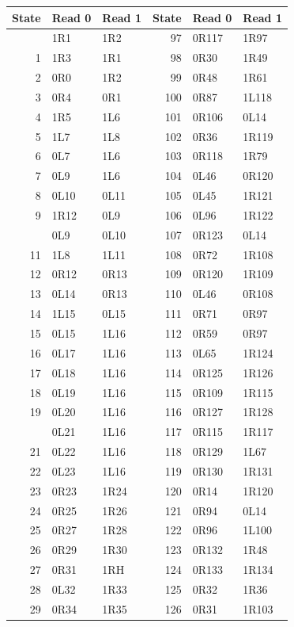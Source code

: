 \begingroup\small\setlength{\tabcolsep}{12pt}
\begin{longtable}{@{}rll@{\qquad}rll@{}}
\toprule
State & Read 0 & Read 1 & State & Read 0 & Read 1\\
\midrule\endhead
\bottomrule\endfoot
0 & 1R1 & 1R2 & 97 & 0R117 & 1R97\\
1 & 1R3 & 1R1 & 98 & 0R30 & 1R49\\
2 & 0R0 & 1R2 & 99 & 0R48 & 1R61\\
3 & 0R4 & 0R1 & 100 & 0R87 & 1L118\\
4 & 1R5 & 1L6 & 101 & 0R106 & 0L14\\
5 & 1L7 & 1L8 & 102 & 0R36 & 1R119\\
6 & 0L7 & 1L6 & 103 & 0R118 & 1R79\\
7 & 0L9 & 1L6 & 104 & 0L46 & 0R120\\
8 & 0L10 & 0L11 & 105 & 0L45 & 1R121\\
9 & 1R12 & 0L9 & 106 & 0L96 & 1R122\\
\addlinespace[3pt]
10 & 0L9 & 0L10 & 107 & 0R123 & 0L14\\
11 & 1L8 & 1L11 & 108 & 0R72 & 1R108\\
12 & 0R12 & 0R13 & 109 & 0R120 & 1R109\\
13 & 0L14 & 0R13 & 110 & 0L46 & 0R108\\
14 & 1L15 & 0L15 & 111 & 0R71 & 0R97\\
15 & 0L15 & 1L16 & 112 & 0R59 & 0R97\\
16 & 0L17 & 1L16 & 113 & 0L65 & 1R124\\
17 & 0L18 & 1L16 & 114 & 0R125 & 1R126\\
18 & 0L19 & 1L16 & 115 & 0R109 & 1R115\\
19 & 0L20 & 1L16 & 116 & 0R127 & 1R128\\
\addlinespace[3pt]
20 & 0L21 & 1L16 & 117 & 0R115 & 1R117\\
21 & 0L22 & 1L16 & 118 & 0R129 & 1L67\\
22 & 0L23 & 1L16 & 119 & 0R130 & 1R131\\
23 & 0R23 & 1R24 & 120 & 0R14 & 1R120\\
24 & 0R25 & 1R26 & 121 & 0R94 & 0L14\\
25 & 0R27 & 1R28 & 122 & 0R96 & 1L100\\
26 & 0R29 & 1R30 & 123 & 0R132 & 1R48\\
27 & 0R31 & 1RH & 124 & 0R133 & 1R134\\
28 & 0L32 & 1R33 & 125 & 0R32 & 1R36\\
29 & 0R34 & 1R35 & 126 & 0R31 & 1R103\\

\end{longtable}
